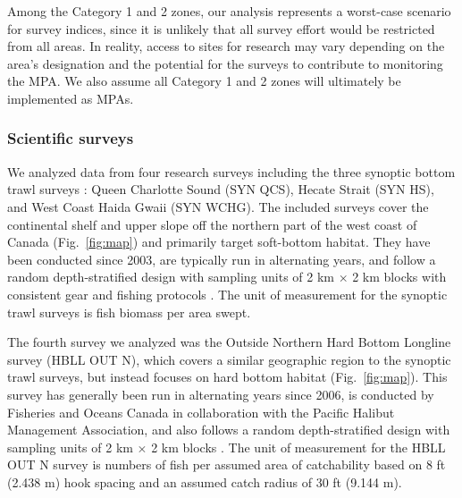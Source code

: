 \documentclass[12pt]{article}
\begin{document}
Among the Category 1 and 2 zones, our analysis represents a worst-case scenario for survey indices, since it is unlikely that all survey effort would be restricted from all areas.
In reality, access to sites for research may vary depending on the area's designation and the potential for the surveys to contribute to monitoring the MPA.
We also assume all Category 1 and 2 zones will ultimately be implemented as MPAs.

\subsubsection*{Scientific surveys}

We analyzed data from four research surveys including the three synoptic bottom trawl surveys \citep[][Fig.~\ref{fig:map}]{sinclair2003syn, anderson2019synopsis}: 
Queen Charlotte Sound (SYN QCS), 
Hecate Strait (SYN HS), and 
West Coast Haida Gwaii (SYN WCHG). 
The included surveys cover the continental shelf and upper slope off the northern part of the west coast of Canada (Fig.~\ref{fig:map}) and primarily target soft-bottom habitat. They have been conducted since 2003, are typically run in alternating years, and follow a random depth-stratified design with sampling units of 2 km $\times$ 2 km blocks with consistent gear and fishing protocols \citep{sinclair2003syn}. The unit of measurement for the synoptic trawl surveys is fish biomass per area swept.

The fourth survey we analyzed was the Outside Northern Hard Bottom Longline survey (HBLL OUT N), which covers a similar geographic region to the synoptic trawl surveys, but instead focuses on hard bottom habitat \citep{doherty2019hbllout} (Fig.~\ref{fig:map}). This survey has generally been run in alternating years since 2006, is conducted by Fisheries and Oceans Canada in collaboration with the Pacific Halibut Management Association, and also follows a random depth-stratified design with sampling units of 2 km $\times$ 2 km blocks \citep{doherty2019hbllout, anderson2019synopsis}. The unit of measurement for the HBLL OUT N survey is numbers of fish per assumed area of catchability based on 8 ft (2.438 m) hook spacing and an assumed catch radius of 30 ft (9.144 m).
\end{document}
